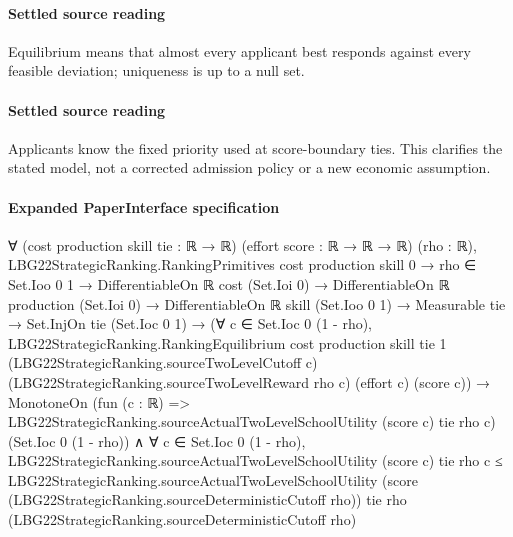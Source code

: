 \documentclass[10pt]{article}
\begin{document}
\paragraph{Settled source reading}
\begin{sloppypar}
Equilibrium means that almost every applicant best responds against every feasible deviation;\allowbreak{} uniqueness is up to a null set.\allowbreak{}
\end{sloppypar}
\paragraph{Settled source reading}
\begin{sloppypar}
Applicants know the fixed priority used at score-\allowbreak{}boundary ties.\allowbreak{} This clarifies the stated model, not a corrected admission policy or a new economic assumption.\allowbreak{}
\end{sloppypar}

\paragraph{Expanded PaperInterface specification}
\begin{ReviewVerbatim}
∀ (cost production skill tie : ℝ → ℝ) (effort score : ℝ → ℝ → ℝ) (rho : ℝ),
  LBG22StrategicRanking.RankingPrimitives cost production skill 0 →
    rho ∈ Set.Ioo 0 1 →
      DifferentiableOn ℝ cost (Set.Ioi 0) →
        DifferentiableOn ℝ production (Set.Ioi 0) →
          DifferentiableOn ℝ skill (Set.Ioo 0 1) →
            Measurable tie →
              Set.InjOn tie (Set.Ioc 0 1) →
                (∀ c ∈ Set.Ioc 0 (1 - rho),
                    LBG22StrategicRanking.RankingEquilibrium cost production skill tie 1
                      (LBG22StrategicRanking.sourceTwoLevelCutoff c) (LBG22StrategicRanking.sourceTwoLevelReward rho c)
                      (effort c) (score c)) →
                  MonotoneOn
                      (fun (c : ℝ) => LBG22StrategicRanking.sourceActualTwoLevelSchoolUtility (score c) tie rho c)
                      (Set.Ioc 0 (1 - rho)) ∧
                    ∀ c ∈ Set.Ioc 0 (1 - rho),
                      LBG22StrategicRanking.sourceActualTwoLevelSchoolUtility (score c) tie rho c ≤
                        LBG22StrategicRanking.sourceActualTwoLevelSchoolUtility
                          (score (LBG22StrategicRanking.sourceDeterministicCutoff rho)) tie rho
                          (LBG22StrategicRanking.sourceDeterministicCutoff rho)
\end{ReviewVerbatim}
\end{document}
